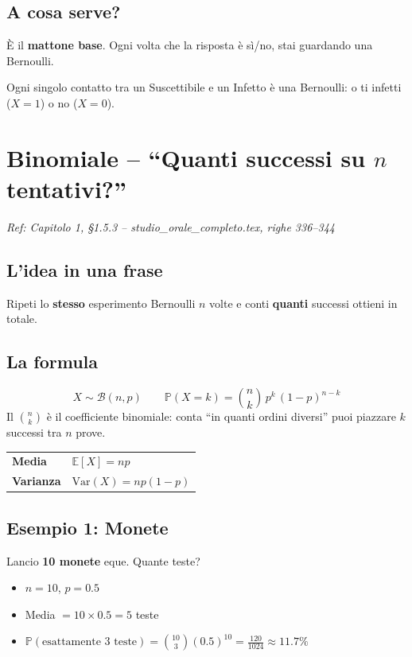 \documentclass[a4paper,11pt]{article}
\newcommand{\PP}{\mathbb{P}}
\newcommand{\E}{\mathbb{E}}
\begin{document}
\subsection*{A cosa serve?}
È il \textbf{mattone base}. Ogni volta che la risposta è sì/no, stai guardando una Bernoulli.

\begin{tcolorbox}[mybox=green, title=Nel modello SIR]
Ogni singolo contatto tra un Suscettibile e un Infetto è una Bernoulli: o ti infetti ($X=1$) o no ($X=0$).
\end{tcolorbox}

\section{Binomiale -- ``Quanti successi su $n$ tentativi?''}
\label{sec:binomiale}

\textit{Ref: Capitolo 1, \S1.5.3 -- studio\_orale\_completo.tex, righe 336--344}

\subsection*{L'idea in una frase}
Ripeti lo \textbf{stesso} esperimento Bernoulli $n$ volte e conti \textbf{quanti} successi ottieni in totale.

\subsection*{La formula}
\[
X \sim \mathcal{B}(n,p) \qquad \PP(X = k) = \binom{n}{k} \, p^k \, (1-p)^{n-k}
\]
Il $\binom{n}{k}$ è il coefficiente binomiale: conta ``in quanti ordini diversi'' puoi piazzare $k$ successi tra $n$ prove.

\begin{center}
\begin{tabular}{ll}
\toprule
\textbf{Media} & $\E[X] = np$ \\
\textbf{Varianza} & $\text{Var}(X) = np(1-p)$ \\
\bottomrule
\end{tabular}
\end{center}

\subsection*{Esempio 1: Monete}
Lancio \textbf{10 monete} eque. Quante teste?
\begin{itemize}[nosep]
    \item $n = 10$, $p = 0.5$
    \item Media $= 10 \times 0.5 = 5$ teste
    \item $\PP(\text{esattamente 3 teste}) = \binom{10}{3}(0.5)^{10} = \frac{120}{1024} \approx 11.7\%$
\end{itemize}
\end{document}
